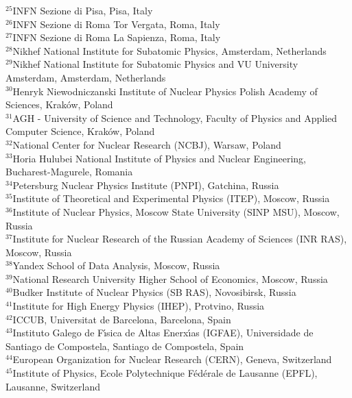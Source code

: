 \begin{flushleft}
{$ ^{25}$INFN Sezione di Pisa, Pisa, Italy\\
$ ^{26}$INFN Sezione di Roma Tor Vergata, Roma, Italy\\
$ ^{27}$INFN Sezione di Roma La Sapienza, Roma, Italy\\
$ ^{28}$Nikhef National Institute for Subatomic Physics, Amsterdam, Netherlands\\
$ ^{29}$Nikhef National Institute for Subatomic Physics and VU University Amsterdam, Amsterdam, Netherlands\\
$ ^{30}$Henryk Niewodniczanski Institute of Nuclear Physics  Polish Academy of Sciences, Krak{\'o}w, Poland\\
$ ^{31}$AGH - University of Science and Technology, Faculty of Physics and Applied Computer Science, Krak{\'o}w, Poland\\
$ ^{32}$National Center for Nuclear Research (NCBJ), Warsaw, Poland\\
$ ^{33}$Horia Hulubei National Institute of Physics and Nuclear Engineering, Bucharest-Magurele, Romania\\
$ ^{34}$Petersburg Nuclear Physics Institute (PNPI), Gatchina, Russia\\
$ ^{35}$Institute of Theoretical and Experimental Physics (ITEP), Moscow, Russia\\
$ ^{36}$Institute of Nuclear Physics, Moscow State University (SINP MSU), Moscow, Russia\\
$ ^{37}$Institute for Nuclear Research of the Russian Academy of Sciences (INR RAS), Moscow, Russia\\
$ ^{38}$Yandex School of Data Analysis, Moscow, Russia\\
$ ^{39}$National Research University Higher School of Economics, Moscow, Russia\\
$ ^{40}$Budker Institute of Nuclear Physics (SB RAS), Novosibirsk, Russia\\
$ ^{41}$Institute for High Energy Physics (IHEP), Protvino, Russia\\
$ ^{42}$ICCUB, Universitat de Barcelona, Barcelona, Spain\\
$ ^{43}$Instituto Galego de F{\'\i}sica de Altas Enerx{\'\i}as (IGFAE), Universidade de Santiago de Compostela, Santiago de Compostela, Spain\\
$ ^{44}$European Organization for Nuclear Research (CERN), Geneva, Switzerland\\
$ ^{45}$Institute of Physics, Ecole Polytechnique  F{\'e}d{\'e}rale de Lausanne (EPFL), Lausanne, Switzerland\\
}
\end{flushleft}
